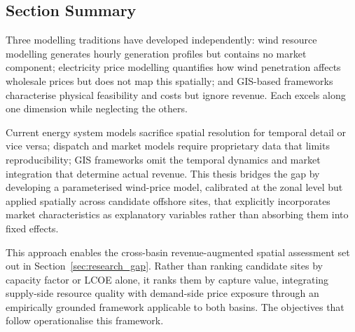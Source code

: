 \subsection{Section Summary}\label{sec:modelling_summary}

Three modelling traditions have developed independently: wind resource modelling generates hourly generation profiles but contains no market component; electricity price modelling quantifies how wind penetration affects wholesale prices but does not map this spatially; and GIS-based frameworks characterise physical feasibility and costs but ignore revenue. Each excels along one dimension while neglecting the others.

Current energy system models sacrifice spatial resolution for temporal detail or vice versa; dispatch and market models require proprietary data that limits reproducibility; GIS frameworks omit the temporal dynamics and market integration that determine actual revenue. This thesis bridges the gap by developing a parameterised wind-price model, calibrated at the zonal level but applied spatially across candidate offshore sites, that explicitly incorporates market characteristics as explanatory variables rather than absorbing them into fixed effects.

This approach enables the cross-basin revenue-augmented spatial assessment set out in Section~\ref{sec:research_gap}. Rather than ranking candidate sites by capacity factor or LCOE alone, it ranks them by capture value, integrating supply-side resource quality with demand-side price exposure through an empirically grounded framework applicable to both basins. The objectives that follow operationalise this framework.
